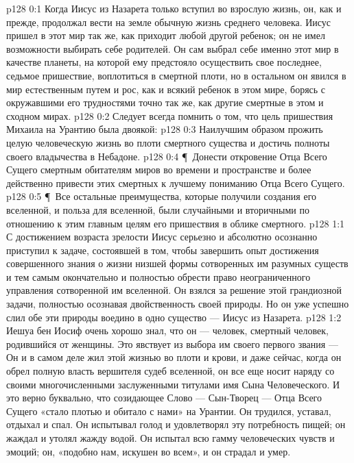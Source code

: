 \author{Комиссия срединников}
\vs p128 0:1 Когда Иисус из Назарета только вступил во взрослую жизнь, он, как и прежде, продолжал вести на земле обычную жизнь среднего человека. Иисус пришел в этот мир так же, как приходит любой другой ребенок; он не имел возможности выбирать себе родителей. Он сам выбрал себе именно этот мир в качестве планеты, на которой ему предстояло осуществить свое последнее, седьмое пришествие, воплотиться в смертной плоти, но в остальном он явился в мир естественным путем и рос, как и всякий ребенок в этом мире, борясь с окружавшими его трудностями точно так же, как другие смертные в этом и сходном мирах.
\vs p128 0:2 Следует всегда помнить о том, что цель пришествия Михаила на Урантию была двоякой:
\vs p128 0:3 \bibnobreakspace Наилучшим образом прожить целую человеческую жизнь во плоти смертного существа и достичь полноты своего владычества в Небадоне.
\vs p128 0:4 \P\ \bibnobreakspace Донести откровение Отца Всего Сущего смертным обитателям миров во времени и пространстве и более действенно привести этих смертных к лучшему пониманию Отца Всего Сущего.
\vs p128 0:5 \P\ Все остальные преимущества, которые получили создания его вселенной, и польза для вселенной, были случайными и вторичными по отношению к этим главным целям его пришествия в облике смертного.
\vs p128 1:1 С достижением возраста зрелости Иисус серьезно и абсолютно осознанно приступил к задаче, состоявшей в том, чтобы завершить опыт достижения совершенного знания о жизни низшей формы сотворенных им разумных существ и тем самым окончательно и полностью обрести право неограниченного управления сотворенной им вселенной. Он взялся за решение этой грандиозной задачи, полностью осознавая двойственность своей природы. Но он уже успешно слил обе эти природы воедино в одно существо --- Иисус из Назарета.
\vs p128 1:2 Иешуа бен Иосиф очень хорошо знал, что он --- человек, смертный человек, родившийся от женщины. Это явствует из выбора им своего первого звания ---  Он и в самом деле жил этой жизнью во плоти и крови, и даже сейчас, когда он обрел полную власть вершителя судеб вселенной, он все еще носит наряду со своими многочисленными заслуженными титулами имя Сына Человеческого. И это верно буквально, что созидающее Слово --- Сын\hyp{}Творец --- Отца Всего Сущего «стало плотью и обитало с нами» на Урантии. Он трудился, уставал, отдыхал и спал. Он испытывал голод и удовлетворял эту потребность пищей; он жаждал и утолял жажду водой. Он испытал всю гамму человеческих чувств и эмоций; он, «подобно нам, искушен во всем», и он страдал и умер.
